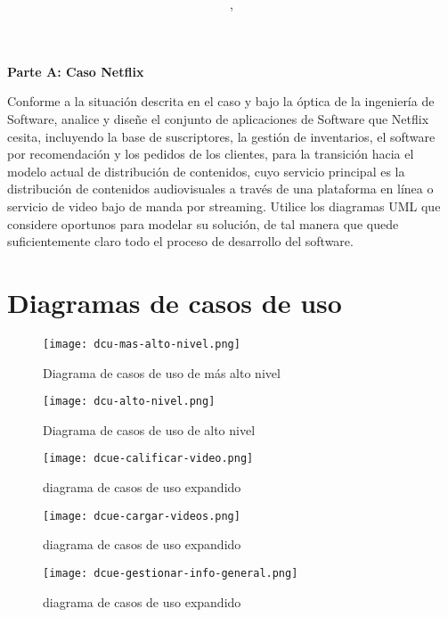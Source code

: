 \documentclass{article}
\author{\nombre , \carnet}
\title{\textbf{\Huge\titulo}}
\newcommand*\rbreak{\par\noindent\linebreak}
\begin{document}
\maketitle
\textbf{\huge{Parte A: Caso Netflix}}\rbreak
Conforme a la situación descrita en el caso y bajo
la óptica de la ingeniería de Software, analice y
diseñe el conjunto de aplicaciones de Software
que Netflix cesita, incluyendo la base de 
suscriptores, la gestión de inventarios, el software
por recomendación y los pedidos de los
clientes, para la transición hacia el modelo actual de
distribución de contenidos, cuyo servicio principal
es la distribución de contenidos audiovisuales
a través de una plataforma en línea o 
servicio de video bajo de manda por streaming. Utilice
los diagramas UML que considere oportunos para
modelar su solución, de tal manera que quede 
suficientemente claro todo el proceso de desarrollo
del software.
\section{Diagramas de casos de uso}
\begin{figure}[h]
	\centering
        \texttt{[image: dcu-mas-alto-nivel.png]}
                 \caption{Diagrama de casos de uso de más alto nivel}
\end{figure}	

\begin{figure}[h]
	\centering
        \texttt{[image: dcu-alto-nivel.png]}
                 \caption{Diagrama de casos de uso de alto nivel}
\end{figure}	

\begin{figure}[h]
	\centering
        \texttt{[image: dcue-calificar-video.png]}
                 \caption{diagrama de casos de uso expandido}
\end{figure}	

\begin{figure}[h]
	\centering
        \texttt{[image: dcue-cargar-videos.png]}
                 \caption{diagrama de casos de uso expandido}
\end{figure}	

\begin{figure}[h]
	\centering
        \texttt{[image: dcue-gestionar-info-general.png]}
                 \caption{diagrama de casos de uso expandido}
\end{figure}	
\end{document}
